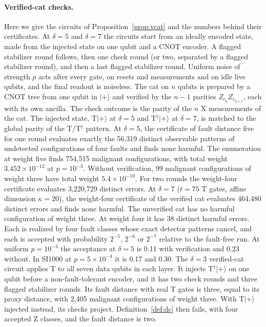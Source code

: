 \documentclass[aps,prl,reprint,twocolumn,amsmath,amssymb,floatfix,nofootinbib,superscriptaddress]{revtex4-2}
\theoremstyle{definition}
\theoremstyle{remark}
\begin{document}
\paragraph*{Verified-cat checks.}
Here we give the circuits of Proposition~\ref{prop:vcat} and the numbers behind their certificates. At $\delta=5$ and $\delta=7$ the circuits start from an ideally encoded state, made from the injected state on one qubit and a CNOT encoder. A flagged stabilizer round follows, then one check round (or two, separated by a flagged stabilizer round), and then a last flagged stabilizer round. Uniform noise of strength $p$ acts after every gate, on resets and measurements and on idle live qubits, and the final readout is noiseless. The cat on $n$ qubits is prepared by a CNOT tree from one qubit in $|{+}\rangle$ and verified by the $n-1$ parities $Z_{c_q}Z_{c_{q+1}}$, each with its own ancilla. The check outcome is the parity of the $n$ X measurements of the cat. The injected state, T$|{+}\rangle$ at $\delta=5$ and T$^\dagger|{+}\rangle$ at $\delta=7$, is matched to the global parity of the T/T$^\dagger$ pattern. At $\delta=5$, the certificate of fault distance five for one round evaluates exactly the 56,319 distinct observable patterns of undetected configurations of four faults and finds none harmful. The enumeration at weight five finds 754,515 malignant configurations, with total weight $3.452\times10^{-12}$ at $p=10^{-3}$. Without verification, 99 malignant configurations of weight three have total weight $5.4\times10^{-10}$. For two rounds the weight-four certificate evaluates 3,220,729 distinct errors. At $\delta=7$ ($t=75$ T gates, affine dimension $\kappa=20$), the weight-four certificate of the verified cat evaluates 464,480 distinct errors and finds none harmful. The unverified cat has no harmful configuration of weight three. At weight four it has 38 distinct harmful errors. Each is realized by four fault classes whose exact detector patterns cancel, and each is accepted with probability $2^{-5}$, $2^{-6}$ or $2^{-7}$ relative to the fault-free run. At uniform $p=10^{-3}$ the acceptance at $\delta=5$ is 0.11 with verification and 0.23 without. In SI1000 at $p=5\times10^{-4}$ it is 0.17 and 0.30. The $\delta=3$ verified-cat circuit applies T to all seven data qubits in each layer. It injects T$^\dagger|{+}\rangle$ on one qubit before a non-fault-tolerant encoder, and it has two check rounds and three flagged stabilizer rounds. Its fault distance with real T gates is three, equal to its proxy distance, with 2,405 malignant configurations of weight three. With T$|{+}\rangle$ injected instead, its checks project. Definition~\ref{def:dc} then fails, with four accepted Z classes, and the fault distance is two.
\end{document}
